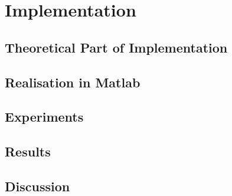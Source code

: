 \chapter{Implementation}
\label{ch:Implementation}

\section{Theoretical Part of Implementation}

\section{Realisation in Matlab}

\section{Experiments}

\section{Results}

\section{Discussion}

